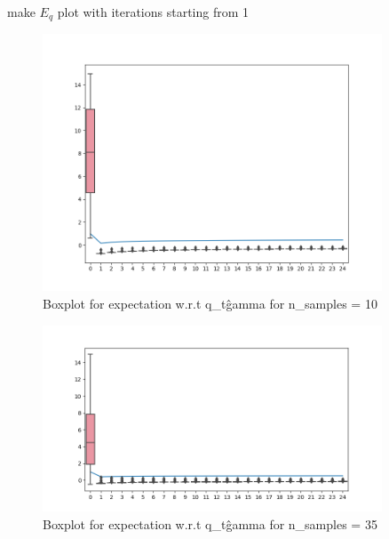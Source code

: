 \TODO make $E_q$ plot with iterations starting from 1
\begin{figure}[h] \label{fig:eq10}
  \centering
  \includegraphics[width=0.9\textwidth]{plots/box_e_q_10.png}
  \caption{Boxplot for expectation w.r.t q\_t\^gamma for n\_samples = 10}
\end{figure}
\begin{figure}[h] \label{fig:eq35}
\centering
\includegraphics[width=0.9\textwidth]{plots/box_e_q_35.png}
\caption{Boxplot for expectation w.r.t q\_t\^gamma for n\_samples = 35}
\end{figure}
